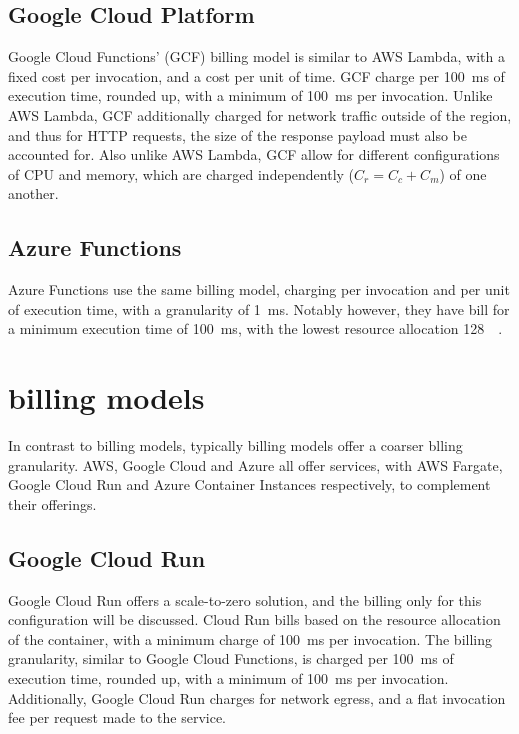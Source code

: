 \subsection{Google Cloud Platform}
Google Cloud Functions' (GCF) billing model is similar to AWS Lambda, with a fixed cost per invocation, and a cost per unit of time. GCF charge per \SI{100}{\milli\second} of execution time, rounded up, with a minimum of \SI{100}{\milli\second} per invocation\cite{PricingCloudFunctions}. Unlike AWS Lambda, GCF additionally charged for network traffic outside of the region, and thus for HTTP requests, the size of the response payload must also be accounted for. Also unlike AWS Lambda, GCF allow for different configurations of CPU and memory, which are charged independently ($C_r = C_c + C_m$) of one another.

\subsection{Azure Functions}
Azure Functions use the same billing model, charging per invocation and per unit of execution time, with a granularity of \SI{1}{\milli\second}\cite{PricingFunctionsMicrosoft}. Notably however, they have bill for a minimum execution time of \SI{100}{\milli\second}, with the lowest resource allocation \SI{128}{\mega\byte}.

\section{\caas{} billing models}
In contrast to \faas{} billing models, typically \caasxlong{} billing models offer a coarser blling granularity. AWS, Google Cloud and Azure all offer \caas{} services, with AWS Fargate, Google Cloud Run and Azure Container Instances respectively, to complement their \faas{} offerings.

\subsection{Google Cloud Run}
\label{sec:cloud-run-billing-model}
Google Cloud Run offers a scale-to-zero solution, and the billing only for this configuration will be discussed. Cloud Run bills based on the resource allocation of the container, with a minimum charge of \SI{100}{\milli\second} per invocation\cite{PricingCloudRun}. The billing granularity, similar to Google Cloud Functions, is charged per \SI{100}{\milli\second} of execution time, rounded up, with a minimum of \SI{100}{\milli\second} per invocation. Additionally, Google Cloud Run charges for network egress, and a flat invocation fee per request made to the service.

